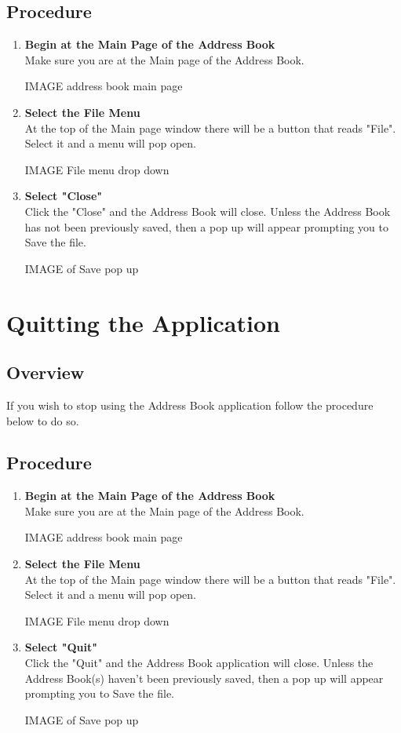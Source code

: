 \documentclass[a4paper, 11pt]{article}
\newlength{\drop}
\begin{document}
\subsection{Procedure}
\begin{enumerate}[label=\textbf{\arabic*})]
    \item{\textbf{Begin at the Main Page of the Address Book}}\\ Make sure you are at the Main page of the Address Book.
    
    IMAGE address book main page
    
    \item{\textbf{Select the File Menu}}\\ At the top of the Main page window there will be a button that reads "File". Select it and a menu will pop open.
    
    IMAGE File menu drop down  
    
    \item{\textbf{Select "Close"}}\\ Click the "Close" and the Address Book will close. Unless the Address Book has not been previously saved, then a pop up will appear prompting you to Save the file.
    
    IMAGE of Save pop up 
\end{enumerate}


\section{Quitting the Application}
\subsection{Overview}
If you wish to stop using the Address Book application follow the procedure below to do so. 
\subsection{Procedure}
\begin{enumerate}[label=\textbf{\arabic*})]
    \item{\textbf{Begin at the Main Page of the Address Book}}\\ Make sure you are at the Main page of the Address Book.
    
    IMAGE address book main page
    
    \item{\textbf{Select the File Menu}}\\ At the top of the Main page window there will be a button that reads "File". Select it and a menu will pop open.
    
    IMAGE File menu drop down  
    
    \item{\textbf{Select "Quit"}}\\ Click the "Quit" and the Address Book application will close. Unless the Address Book(s) haven't been previously saved, then a pop up will appear prompting you to Save the file.
    
    IMAGE of Save pop up 
\end{enumerate}
\end{document}
